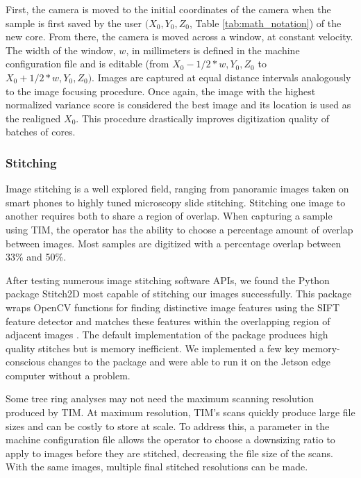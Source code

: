 \documentclass[a4paper,12pt]{article}
\begin{document}
First, the camera is moved to the initial coordinates of the camera when the sample is first saved by the user $(X_0, Y_0, Z_0$, Table \ref{tab:math_notation}) of the new core. 
From there, the camera is moved across a window, at constant velocity. %
The width of the window, $w$, in millimeters is defined in the machine configuration file and is editable %
(from $X_0 - 1/2*{w}, Y_0, Z_0$ to $X_0 + 1/2*{w}, Y_0, Z_0)$. 
Images are captured at equal distance intervals analogously to the image focusing procedure. 
Once again, the image with the highest normalized variance score is considered the best image and its location is used as the realigned $X_0$.
This procedure drastically improves digitization quality of batches of cores.

\subsubsection{Stitching}

Image stitching is a well explored field, ranging from panoramic images taken on smart phones to highly tuned microscopy slide stitching. 
Stitching one image to another requires both to share a region of overlap. When capturing a sample using TIM, the operator has the ability to choose a percentage amount of overlap between images.
Most samples are digitized with a percentage overlap between 33\% and 50\%.

After testing numerous image stitching software APIs, we found the Python package Stitch2D most capable of stitching our images successfully. %
This package wraps OpenCV functions for finding distinctive image features using the SIFT feature detector and matches these features within the overlapping region of adjacent images \citep{lowe_distinctive_2004}. 
The default implementation of the package produces high quality stitches but is memory inefficient. %
We implemented a few key memory-conscious changes to the package and were able to run it on the Jetson edge computer without a problem. %

Some tree ring analyses may not need the maximum scanning resolution produced by TIM. At maximum resolution, TIM's scans quickly produce large file sizes and can be costly to store at scale. 
To address this, a parameter in the machine configuration file allows the operator to choose a downsizing ratio to apply to images before they are stitched, decreasing the file size of the scans.
With the same images, multiple final stitched resolutions can be made. 
\end{document}
